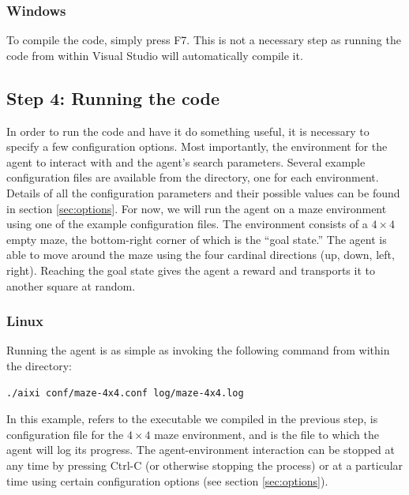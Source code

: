\documentclass[a4paper,11pt]{article}
\begin{document}
\subsubsection{Windows}
To compile the code, simply press F7. This is not a necessary step as running the code from within Visual Studio will automatically compile it.


\subsection{Step 4: Running the code}


In order to run the code and have it do something useful, it is necessary to specify a few configuration options. Most importantly, the environment for the agent to interact with and the agent's search parameters. Several example configuration files are available from the  directory, one for each environment. Details of all the configuration parameters and their possible values can be found in section \ref{sec:options}. For now, we will run the agent on a maze environment using one of the example configuration files. The environment consists of a $4 \times 4$ empty maze, the bottom-right corner of which is the ``goal state.'' The agent is able to move around the maze using the four cardinal directions (up, down, left, right). Reaching the goal state gives the agent a reward and transports it to another square at random.

\subsubsection{Linux}
Running the agent is as simple as invoking the following command from within the  directory:
\begin{lstlisting}[frame=single]
./aixi conf/maze-4x4.conf log/maze-4x4.log
\end{lstlisting}
In this example,  refers to the executable we compiled in the previous step,  is  configuration file for the $4 \times 4$ maze environment, and  is the file to which the agent will log its progress. The agent-environment interaction can be stopped at any time by pressing Ctrl-C (or otherwise stopping the process) or at a particular time using certain configuration options (see section \ref{sec:options}).
\end{document}
